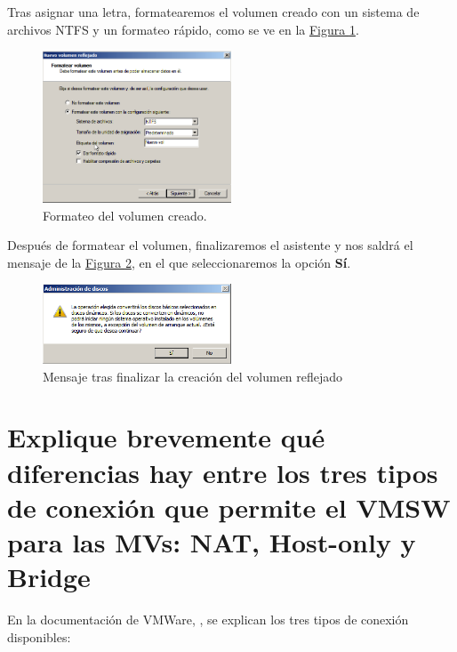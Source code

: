 \documentclass[10pt,a4paper,spanish]{article}
\numberwithin{equation}{section} %
\numberwithin{figure}{section} %
\numberwithin{table}{section} %
\begin{document}
Tras asignar una letra, formatearemos el volumen creado con un sistema de archivos NTFS y un formateo rápido, como se ve en la \hyperref[formateo]{Figura \ref*{formateo}}.

\begin{figure}[!h]
\centering
\includegraphics[width=0.5\textwidth]{17}
\caption{Formateo del volumen creado.}
\label{formateo}
\end{figure}

Después de formatear el volumen, finalizaremos el asistente y nos saldrá el mensaje de la \hyperref[mensaje]{Figura \ref*{mensaje}}, en el que seleccionaremos la opción \textbf{Sí}.

\begin{figure}[!h]
\centering
\includegraphics[width=0.5\textwidth]{19}
\caption{Mensaje tras finalizar la creación del volumen reflejado}
\label{mensaje}
\end{figure}

\section{Explique brevemente qué diferencias hay entre los tres tipos de conexión que permite el VMSW para las MVs: NAT, Host-only y Bridge}
En la documentación de VMWare, \cite{tiposconexion}, se explican los tres tipos de conexión disponibles:
\end{document}
